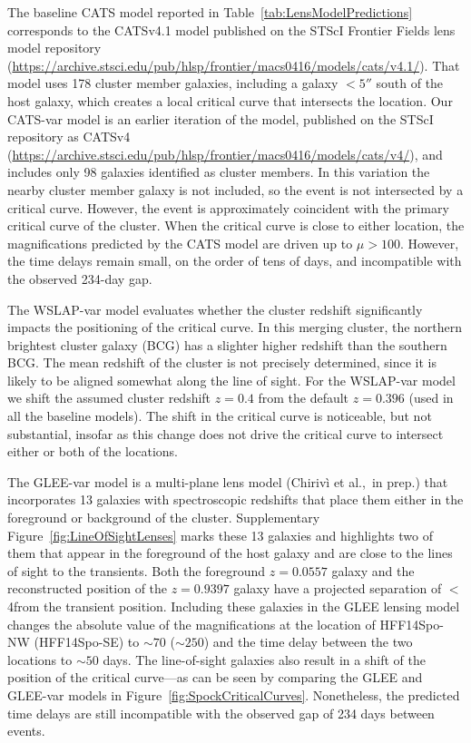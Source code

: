 The baseline CATS model reported in
Table~\ref{tab:LensModelPredictions} corresponds to the CATSv4.1 model
published on the STScI Frontier Fields lens model repository
(\url{https://archive.stsci.edu/pub/hlsp/frontier/macs0416/models/cats/v4.1/}).
That model uses 178 cluster member galaxies, including a galaxy $<5''$
south of the \spock host galaxy, which creates a local critical curve
that intersects the \spocktwo location.  Our CATS-var model is an
earlier iteration of the model, published on the STScI repository as
CATSv4
(\url{https://archive.stsci.edu/pub/hlsp/frontier/macs0416/models/cats/v4/}),
and includes only 98 galaxies identified as cluster members.  In this
variation the nearby cluster member galaxy is not included, so the
\spocktwo event is not intersected by a critical curve. However, the
\spockone event is approximately coincident with the primary critical
curve of the  cluster.  When the critical curve is close to
either \spock location, the magnifications predicted by the CATS model
are driven up to $\mu>100$.  However, the time delays remain small, on
the order of tens of days, and incompatible with the observed 234-day
gap.

The WSLAP-var model evaluates whether the cluster redshift
significantly impacts the positioning of the critical curve. In this
merging cluster, the northern brightest cluster galaxy (BCG) has a
slighter higher redshift than the southern BCG. The mean redshift of
the cluster is not precisely determined, since it is likely to be
aligned somewhat along the line of sight.  For the WSLAP-var model we
shift the assumed cluster redshift $z=0.4$ from the default $z=0.396$
(used in all the baseline models).  The shift in the critical curve is
noticeable, but not substantial, insofar as this change does not drive
the critical curve to intersect either or both of the \spock
locations.

The GLEE-var model is a multi-plane lens model (Chiriv{\`i} et al.,~in
prep.) that incorporates 13 galaxies with spectroscopic redshifts that
place them either in the foreground or background of the 
cluster.  Supplementary Figure~\ref{fig:LineOfSightLenses} marks these
13 galaxies and highlights two of them that appear in the foreground
of the \spock host galaxy and are close to the lines of sight to the
\spock transients. Both the foreground $z=0.0557$ galaxy and the
reconstructed position of the $z=0.9397$ galaxy have a projected
separation of $<$4\arcsec from the \spocktwo transient position.
Including these galaxies in the GLEE lensing model changes the
absolute value of the magnifications at the location of HFF14Spo-NW
(HFF14Spo-SE) to $\sim70$ ($\sim250$) and the time delay between the
two locations to $\sim50$ days.  The line-of-sight galaxies also
result in a shift of the position of the critical curve---as can be
seen by comparing the GLEE and GLEE-var models in
Figure~\ref{fig:SpockCriticalCurves}. Nonetheless, the predicted time
delays are still incompatible with the observed gap of 234 days
between events.

